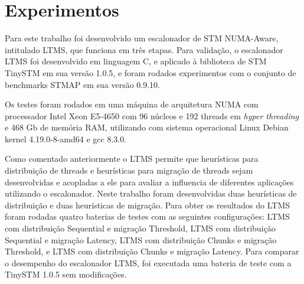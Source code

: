 \documentclass[diss,capa]{texufpel}
\begin{document}








\chapter{Experimentos}
\label{chapter::experimentos}

Para este trabalho foi desenvolvido um escalonador de STM NUMA-Aware, intitulado LTMS, que funciona em três etapas. Para validação, o escalonador LTMS foi desenvolvido em linguagem C, e aplicado à biblioteca de STM TinySTM em sua versão 1.0.5, e foram rodados experimentos com o conjunto de benchmarks STMAP em sua versão 0.9.10.

Os testes foram rodados em uma máquina de arquitetura NUMA com processador Intel Xeon E5-4650 com 96 núcleos e 192 threads em \emph{hyper threading} e 468 Gb de memória RAM, utilizando com sistema operacional Linux Debian kernel 4.19.0-8-amd64  e gcc 8.3.0.

Como comentado anteriormente o LTMS permite que heurísticas para distribuição de threads e heurísticas para migração de threads sejam desenvolvidas e acopladas a ele para avaliar a influencia de diferentes aplicações utilizando o escalonador. Neste trabalho foram desenvolvidas duas heurísticas de distribuição e duas heurísticas de migração. Para obter os resultados do LTMS foram rodadas quatro baterias de testes com as seguintes configurações: LTMS com distribuição Sequential e migração Threshold, LTMS com distribuição Sequential e migração Latency, LTMS com distribuição Chunks e migração Threshold, e LTMS com distribuição Chunks e migração Latency. Para comparar o desempenho do escalonador LTMS, foi executada uma bateria de teste com a TinySTM 1.0.5 sem modificações.
\end{document}
